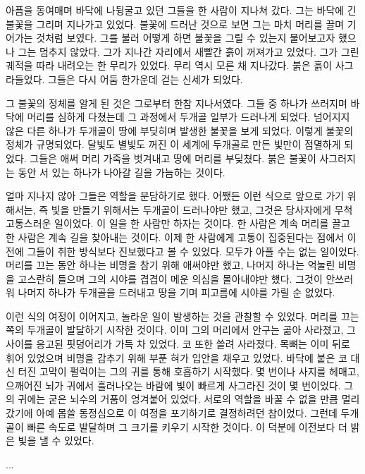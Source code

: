 \documentclass[12pt, b6paper, openany]{memoir}
\newenvironment{article}{}{}
\begin{document}
\begin{article}
    아픔을 동여매며 바닥에 나뒹굴고 있던 그들을 한 사람이 지나쳐 갔다. 그는 바닥에 긴 불꽃을 그리며 지나가고 있었다. 불꽃에 드러난 것으로 보면 그는 마치 머리를 끌며 기어가는 것처럼 보였다. 그를 불러 어떻게 하면 불꽃을 그릴 수 있는지 물어보고자 했으나 그는 멈추지 않았다. 그가 지나간 자리에서 새빨간 흙이 꺼져가고 있었다. 그가 그린 궤적을 따라 내려오는 한 무리가 있었다. 무리 역시 모른 채 지나갔다. 붉은 흙이 사그라들었다. 그들은 다시 어둠 한가운데 걷는 신세가 되었다.
    
    그 불꽃의 정체를 알게 된 것은 그로부터 한참 지나서였다. 그들 중 하나가 쓰러지며 바닥에 머리를 심하게 다쳤는데 그 과정에서 두개골 일부가 드러나게 되었다. 넘어지지 않은 다른 하나가 두개골이 땅에 부딪히며 발생한 불꽃을 보게 되었다. 이렇게 불꽃의 정체가 규명되었다. 달빛도 별빛도 꺼진 이 세계에 두개골로 만든 빛만이 점멸하게 되었다. 그들은 애써 머리 가죽을 벗겨내고 땅에 머리를 부딪쳤다. 붉은 불꽃이 사그러지는 동안 서 있는 하나가 나아갈 길을 가늠하는 것이다.
    
    얼마 지나지 않아 그들은 역할을 분담하기로 했다. 어쨌든 이런 식으로 앞으로 가기 위해서는, 즉 빛을 만들기 위해서는 두개골이 드러나야만 했고, 그것은 당사자에게 무척 고통스러운 일이었다. 이 일을 한 사람만 하자는 것이다. 한 사람은 계속 머리를 끌고 한 사람은 계속 길을 찾아내는 것이다. 이제 한 사람에게 고통이 집중된다는 점에서 이전에 그들이 취한 방식보다 진보했다고 볼 수 있었다. 모두가 아플 수는 없는 일이었다. 머리를 끄는 동안 하나는 비명을 참기 위해 애써야만 했고, 나머지 하나는 억눌린 비명을 고스란히 들으며 그의 시야를 겹겹이 메운 의심을 몰아내야만 했다. 그것이 안쓰러워 나머지 하나가 두개골을 드러내고 땅을 기며 피고름에 시야를 가릴 순 없었다.
    
    이런 식의 여정이 이어지고, 놀라운 일이 발생하는 것을 관찰할 수 있었다. 머리를 끄는 쪽의 두개골이 발달하기 시작한 것이다. 이미 그의 머리에서 안구는 곪아 사라졌고, 그 사이를 응고된 핏덩어리가 가득 차 있었다. 코 또한 쓸려 사라졌다. 목뼈는 이미 뒤로 휘어 있었으며 비명을 감추기 위해 부푼 혀가 입안을 채우고 있었다. 바닥에 붙은 코 대신 터진 고막이 펄럭이는 그의 귀를 통해 호흡하기 시작했다. 몇 번이나 사지를 헤매고, 으깨어진 뇌가 귀에서 흘러나오는 바람에 빛이 빠르게 사그라진 것이 몇 번이었다. 그의 귀에는 굳은 뇌수의 거품이 엉겨붙어 있었다. 서로의 역할을 바꿀 수 없을 만큼 멀리 갔기에 아예 몹쓸 동정심으로 이 여정을 포기하기로 결정하려던 참이었다. 그런데 두개골이 빠른 속도로 발달하며 그 크기를 키우기 시작한 것이다. 이 덕분에 이전보다 더 밝은 빛을 낼 수 있었다.

\begin{center}
{\Large ...\par}
\end{center}

    \end{article}
    
\end{document}
